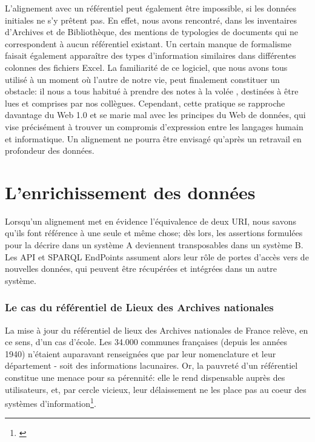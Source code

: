 \documentclass[a4paper,12pt,twoside]{book}
\begin{document}
L'alignement avec un référentiel peut également être impossible, si les données initiales ne s'y prêtent pas. En effet, nous avons rencontré, dans les inventaires d'Archives et de Bibliothèque, des mentions de typologies de documents qui ne correspondent à aucun référentiel existant. Un certain manque de formalisme faisait également apparaître des types d'information similaires dans différentes colonnes des fichiers Excel. La familiarité de ce logiciel, que nous avons tous utilisé à un moment où l'autre de notre vie, peut finalement constituer un obstacle: il nous a tous habitué à prendre des notes \og à la volée \fg, destinées à être lues et comprises par nos collègues. Cependant, cette pratique se rapproche davantage du Web 1.0 et se marie mal avec les principes du Web de données, qui vise précisément à trouver un compromis d'expression entre les langages humain et informatique. Un alignement ne pourra être envisagé qu'après un retravail en profondeur des données.\\

 
\section{L'enrichissement des données}

Lorsqu'un alignement met en évidence l'équivalence de deux URI, nous savons qu'ils font référence à une seule et même chose; dès lors, les assertions formulées pour la décrire dans un système A deviennent transposables dans un système B. Les API et SPARQL EndPoints assument alors leur rôle de portes d'accès vers de nouvelles données, qui peuvent être récupérées et intégrées dans un autre système.\\

\subsubsection{Le cas du référentiel de Lieux des Archives nationales}\label{ref-lieux-AN}

La mise à jour du référentiel de lieux des Archives nationales de France relève, en ce sens, d'un cas d'école. Les 34.000 communes françaises (depuis les années 1940) n'étaient auparavant renseignées que par leur nomenclature et leur département - soit des informations lacunaires. Or, la pauvreté d'un référentiel constitue une menace pour sa pérennité: elle le rend dispensable auprès des utilisateurs, et, par cercle vicieux, leur délaissement ne les place pas au coeur des systèmes d'information\footnote{\cite[p.~72]{clavaudTransformerMetadonneesArchives2019}}.\\
\end{document}
